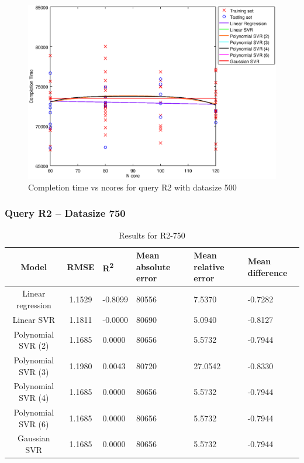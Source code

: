 \documentclass[a4paper,11pt]{article}
\begin{document}
\begin {figure}[hbtp]
\centering
\includegraphics[width=\textwidth]{output/R2_500_ONLY_1_LINEAR_NCORE/plot_R2_500.eps}
\caption{Completion time vs ncores for query R2 with datasize 500}
\label{fig:coreonly_linear_R2_500}
\end {figure}

\newpage
\subsubsection{Query R2 -- Datasize 750}
\begin{table}[H]
	\centering
	\begin{adjustbox}{center}
		\begin{tabular}{c | c M{1.2cm} M{2.5cm} M{2.5cm} M{1.8cm}}
			Model & RMSE & R\textsuperscript{2} & Mean absolute error & Mean relative error & Mean difference \tabularnewline
			\hline
			Linear regression & 1.1529 & -0.8099 &  80556 & 7.5370 & -0.7282 \\
			Linear SVR & 1.1811 & -0.0000 &  80690 & 5.0940 & -0.8127 \\
			Polynomial SVR (2) & 1.1685 & 0.0000 &  80656 & 5.5732 & -0.7944 \\
			Polynomial SVR (3) & 1.1980 & 0.0043 &  80720 & 27.0542 & -0.8330 \\
			Polynomial SVR (4) & 1.1685 & 0.0000 &  80656 & 5.5732 & -0.7944 \\
			Polynomial SVR (6) & 1.1685 & 0.0000 &  80656 & 5.5732 & -0.7944 \\
			Gaussian SVR & 1.1685 & 0.0000 &  80656 & 5.5732 & -0.7944 \\
		\end{tabular}
	\end{adjustbox}
	\\
	\caption{Results for R2-750}
	\label{fig:coreonly_linear_R2_750}
\end{table}
\end{document}
